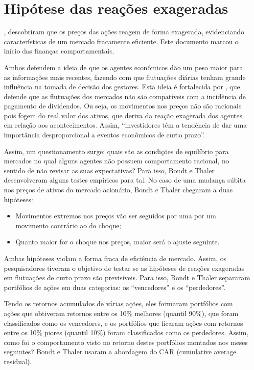 \section{Hipótese das reações exageradas}

, descobriram que os preços das ações reagem de forma exagerada, evidenciando características de um mercado fracamente eficiente. Este documento marcou o início das finanças comportamentais.

Ambos defendem a ideia de que os agentes econômicos dão um peso maior para as informações mais recentes, fazendo com que flutuações diárias tenham grande influência na tomada de decisão dos gestores. Esta ideia é fortalecida por , que defende que as flutuações dos mercados não são compatíveis com a incidência de pagamento de dividendos. Ou seja, os movimentos nos preços não são racionais pois fogem do real valor dos ativos, que deriva da reação exagerada dos agentes em relação aos acontecimentos. Assim, “investidores têm a tendência de dar uma importância desproporcional a eventos econômicos de curto prazo”.

Assim, um questionamento surge: quais são as condições de equilíbrio para mercados no qual alguns agentes não possuem comportamento racional, no sentido de não revisar as suas expectativas? Para isso, Bondt e Thaler desenvolveram alguns testes empíricos para tal. No caso de uma mudança súbita nos preços de ativos do mercado acionário, Bondt e Thaler chegaram a duas hipóteses: 

\begin{itemize}
	\item Movimentos extremos nos preços vão ser seguidos por uma por um movimento contrário ao do choque; 
	\item Quanto maior for o choque nos preços, maior será o ajuste seguinte.
\end{itemize}

Ambas hipóteses violam a forma fraca de eficiência de mercado. Assim, os pesquisadores tiveram o objetivo de testar se as hipóteses de reações exageradas em flutuações de curto prazo são previsíveis. Para isso, Bondt e Thaler separaram portfólios de ações em duas categorias: os “vencedores” e os “perdedores”.

Tendo os retornos acumulados de várias ações, eles formaram portfólios com ações que obtiveram retornos entre os 10\% melhores (quantil 90\%), que foram classificados como os vencedores, e os portfólios que ficaram ações com retornos entre os 10\% piores (quantil 10\%) foram classificados como os perdedores. Assim, como foi o comportamento visto no retorno destes portfólios montados nos meses seguintes? Bondt e Thaler usaram a abordagem do CAR (cumulative average residual).

